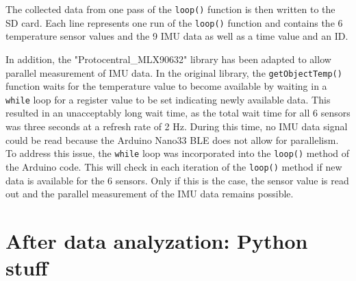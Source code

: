 The collected data from one pass of the \texttt{loop()} function is then written to the SD card. Each line represents one run of the \texttt{loop()} function and contains the 6 temperature sensor values and the 9 IMU data as well as a time value and an ID.

In addition, the "Protocentral\_MLX90632" library has been adapted to allow parallel measurement of IMU data. In the original library, the \texttt{getObjectTemp()} function waits for the temperature value to become available by waiting in a \texttt{while} loop for a register value to be set indicating newly available data. This resulted in an unacceptably long wait time, as the total wait time for all 6 sensors was three seconds at a refresh rate of 2 Hz. During this time, no IMU data signal could be read because the Arduino Nano33 BLE does not allow for parallelism. To address this issue, the \texttt{while} loop was incorporated into the \texttt{loop()} method of the Arduino code. This will check in each iteration of the \texttt{loop()} method if new data is available for the 6 sensors. Only if this is the case, the sensor value is read out and the parallel measurement of the IMU data remains possible.

\section{After data analyzation: Python stuff}